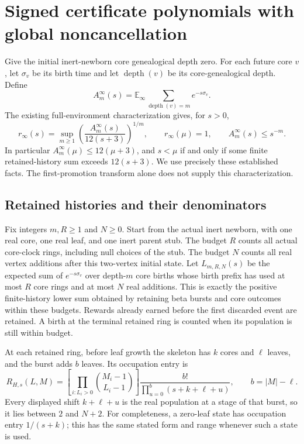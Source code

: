 
\section{Signed certificate polynomials with global noncancellation}
\label{scp:section}

Give the initial inert-newborn core genealogical depth zero. For each
future core $v$, let $\sigma_v$ be its birth time and let
$\operatorname{depth}(v)$ be its core-genealogical depth. Define
\[
 A_m^\infty(s)=\mathbb E_\infty
 \sum_{\operatorname{depth}(v)=m}e^{-s\sigma_v}.
\]
The existing full-environment characterization gives, for $s>0$,
\[
 r_\infty(s)=\sup_{m\ge1}
 \left(\frac{A_m^\infty(s)}{12(s+3)}\right)^{1/m},
 \qquad r_\infty(\mu)=1,
 \qquad A_m^\infty(s)\le s^{-m}.
\]
In particular $A_m^\infty(\mu)\le12(\mu+3)$, and
$s<\mu$ if and only if some finite retained-history sum exceeds
$12(s+3)$. We use precisely these established facts. The first-promotion
transform alone does not supply this characterization.

\subsection{Retained histories and their denominators}

Fix integers $m,R\ge1$ and $N\ge0$. Start from the actual inert
newborn, with one real core, one real leaf, and one inert parent stub.
The budget $R$ counts all actual core-clock rings, including null choices
of the stub. The budget $N$ counts all real vertex additions after this
two-vertex initial state. Let $L_{m,R,N}(s)$ be the expected sum of
$e^{-s\sigma_v}$ over depth-$m$ core births whose birth prefix has used
at most $R$ core rings and at most $N$ real additions. This is exactly
the positive finite-history lower sum obtained by retaining beta bursts
and core outcomes within these budgets. Rewards already earned before
the first discarded event are retained. A birth at the terminal retained
ring is counted when its population is still within budget.

At each retained ring, before leaf growth the skeleton has $k$ cores
and $\ell$ leaves, and the burst adds $b$ leaves. Its occupation entry is
\[
 R_{H,s}(L,M)=
 \left[\prod_{i:L_i>0}\binom{M_i-1}{L_i-1}\right]
 \frac{b!}{\prod_{u=0}^{b}(s+k+\ell+u)},
 \qquad b=|M|-\ell.
\]
Every displayed shift $k+\ell+u$ is the real population at a stage
of that burst, so it lies between $2$ and $N+2$.
For completeness, a zero-leaf state has occupation entry $1/(s+k)$;
this has the same stated form and range whenever such a state is used.

